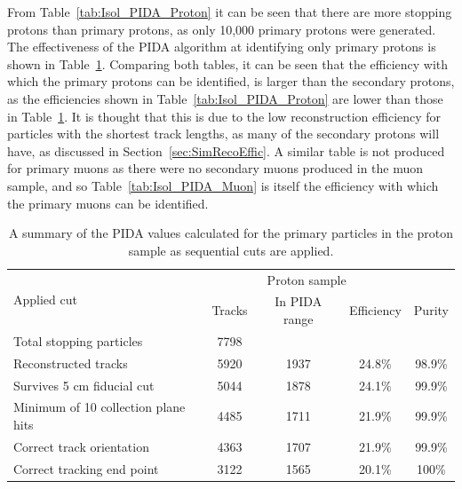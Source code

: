 From Table~\ref{tab:Isol_PIDA_Proton} it can be seen that there are more stopping protons than primary protons, as only 10,000 primary protons were generated. The effectiveness of the PIDA algorithm at identifying only primary protons is shown in Table~\ref{tab:Isol_PIDA_PrimProton}. Comparing both tables, it can be seen that the efficiency with which the primary protons can be identified, is larger than the secondary protons, as the efficiencies shown in Table~\ref{tab:Isol_PIDA_Proton} are lower than those in Table~\ref{tab:Isol_PIDA_PrimProton}. It is thought that this is due to the low reconstruction efficiency for particles with the shortest track lengths, as many of the secondary protons will have, as discussed in Section~\ref{sec:SimRecoEffic}. A similar table is not produced for primary muons as there were no secondary muons produced in the muon sample, and so Table~\ref{tab:Isol_PIDA_Muon} is itself the efficiency with which the primary muons can be identified. \\ 

\begin{table}
  \caption[A summary of the PIDA values calculated for the primary particles in the proton sample as sequential cuts are applied]
          {A summary of the PIDA values calculated for the primary particles in the proton sample as sequential cuts are applied.}
  \centering
  \label{tab:Isol_PIDA_PrimProton}
  \begin{tabular}{l c c c c}
    \toprule
    \multirow{2}{*}{Applied cut} & \multicolumn{3}{c}{Proton sample} \\ 
    \cmidrule{2-5}
      & Tracks & In PIDA range & Efficiency & Purity \\ 
    \midrule
      Total stopping particles            & 7798 &      &        & \\

      Reconstructed tracks                & 5920 & 1937 & 24.8\% & 98.9\% \\

      Survives 5 cm fiducial cut          & 5044 & 1878 & 24.1\% & 99.9\% \\

      Minimum of 10 collection plane hits & 4485 & 1711 & 21.9\% & 99.9\% \\

      Correct track orientation           & 4363 & 1707 & 21.9\% & 99.9\% \\

      Correct tracking end point          & 3122 & 1565 & 20.1\% & 100\%  \\
    \bottomrule
  \end{tabular}
\end{table}

